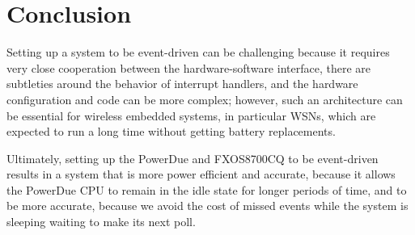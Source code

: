 \section{Conclusion}
\label{sec:conclusion}

Setting up a system to be event-driven can be challenging because it requires
very close cooperation between the hardware-software interface, there are
subtleties around the behavior of interrupt handlers, and the hardware
configuration and code can be more complex; however, such an architecture can be
essential for wireless embedded systems, in particular WSNs, which are expected
to run a long time without getting battery replacements.

Ultimately, setting up the PowerDue and FXOS8700CQ to be event-driven results in
a system that is more power efficient and accurate, because it allows the
PowerDue CPU to remain in the idle state for longer periods of time, and to be
more accurate, because we avoid the cost of missed events while the system is
sleeping waiting to make its next poll.
